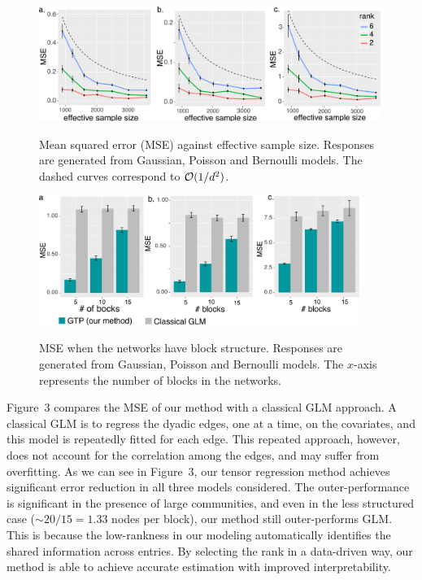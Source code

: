 \documentclass{article}
\theoremstyle{plain}
\theoremstyle{definition}
\begin{document}
\vspace{-.2cm}
\begin{figure}[ht]
\begin{minipage}[b]{0.47\textwidth}

    \centering
    \includegraphics[width=0.99\textwidth]{dimension.pdf}\label{fig:dim}
    \caption{\normalsize{Mean squared error (MSE) against effective sample size. Responses are generated from Gaussian, Poisson and Bernoulli models. The dashed curves correspond to $\mathcal{O}({1/d^2})$.} }

\end{minipage}
\hspace{.5cm}
\begin{minipage}[b]{0.47\textwidth}

   \centering
    \includegraphics[width=0.93\textwidth]{comparison.pdf}\label{fig:glm}
    \vspace{-.2cm}
    \caption{\normalsize{MSE when the networks have block structure. Responses are generated from Gaussian, Poisson and Bernoulli models. The $x$-axis represents the number of blocks in the networks.} }

\end{minipage}
\vspace{-.3cm}
\end{figure}

Figure~3 compares the MSE of our method with a classical GLM approach. A classical GLM is to regress the dyadic edges, one at a time, on the covariates, and this model is repeatedly fitted for each edge. This repeated approach, however, does not account for the correlation among the edges, and may suffer from overfitting. As we can see in Figure~3, our tensor regression method achieves significant error reduction in all three models considered. The outer-performance is significant in the presence of large communities, and even in the less structured case ($\sim 20/15=1.33$ nodes per block), our method still outer-performs GLM. This is because the low-rankness in our modeling automatically identifies the shared information across entries. By selecting the rank in a data-driven way, our method is able to achieve accurate estimation with improved interpretability. 
\end{document}
